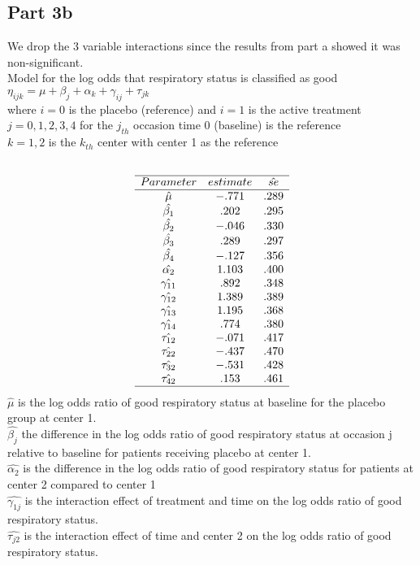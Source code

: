 \documentclass{article}
\begin{document}
\begin{flushleft}
\subsection*{Part 3b}
We drop the 3 variable interactions since the results from part a showed it was non-significant.\\
Model for the log odds that respiratory status is classified as good\\
$\eta_{ijk}=\mu+\beta_j+\alpha_k+\gamma_{ij}+\tau_{jk}$\\
where $i=0$ is the placebo (reference) and $i=1$ is the active treatment\\
$j=0,1,2,3,4$ for the $j_{th}$ occasion time 0 (baseline) is the reference \\
$k=1,2$ is the $k_{th}$ center with center 1 as the reference\\
\begin{multline*}\\
\begin{array}{ccc}
\hline
Parameter & estimate & \hat{se}\\
\hline
\hat{\mu}& -.771&.289\\
\hat{\beta_1}&.202&.295\\
\hat{\beta_2}& -.046&.330\\
\hat{\beta_3}&.289&.297\\
\hat{\beta_4}&-.127&.356\\
\hat{\alpha_2}&1.103&.400\\
\hat{\gamma_{11}}&.892&.348\\
\hat{\gamma_{12}}&1.389&.389\\
\hat{\gamma_{13}}&1.195&.368\\
\hat{\gamma_{14}}&.774&.380\\
\hat{\tau_{12}}&-.071&.417\\
\hat{\tau_{22}}&-.437&.470\\
\hat{\tau_{32}}&-.531&.428\\
\hat{\tau_{42}}&.153&.461\\
\hline
\end{array}\\
\end{multline*}
$\hat{\mu}$ is the log odds ratio of good respiratory status at baseline for the placebo group at center 1.\\
$\hat{\beta_j}$ the difference in the log odds ratio of good respiratory status at occasion j relative to baseline for patients receiving placebo at center 1.\\
$\hat{\alpha_2}$ is the difference in the log odds ratio of good respiratory status for patients at center 2 compared to center 1\\
$\hat{\gamma_{1j}}$ is the interaction effect of treatment and time on the log odds ratio of good respiratory status.\\
$\hat{\tau_{j2}}$ is the interaction effect of time and center 2 on the log odds ratio of good respiratory status.\\

\end{flushleft}
\end{document}

